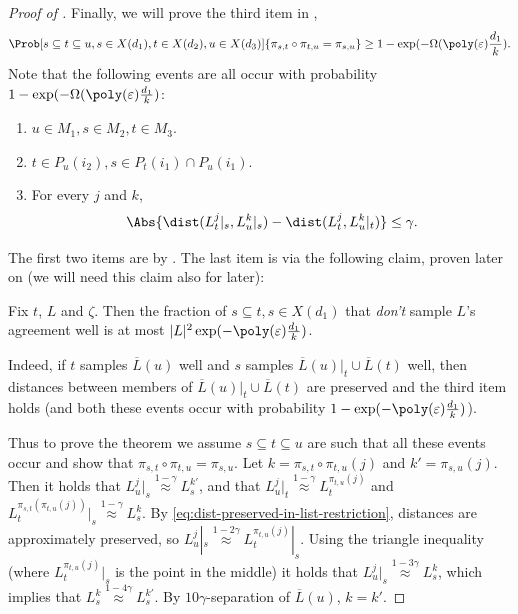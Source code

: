 \begin{proof}[Proof of ]
Finally, we will prove the third item in ,
\begin{equation*}
    \Prob[s \subseteq t \subseteq u, s \in X(d_1),t \in X(d_2), u \in X(d_3)]{\pi_{s,t}\circ \pi_{t,u} = \pi_{s,u}} \geq 1-\exp(-\Omega(\poly(\varepsilon) \frac{d_1}{k}).
\end{equation*}
Note that the following events are all occur with probability \(1-\exp(-\Omega(\poly(\varepsilon) \frac{d_1}{k})\):
\begin{enumerate}
    \item \(u \in M_1, s \in M_2, t \in M_3\).
    \item \(t \in P_u(i_2), s \in P_t(i_1) \cap P_u(i_1)\).
    \item For every \(j\) and \(k\), 
    \begin{equation} \label{eq:dist-preserved-in-list-restriction}
        \Abs{\dist(L_t^j|_s,L_u^k|_s) - \dist(L_t^j,L_u^k|_t)} \leq \gamma.
    \end{equation}
\end{enumerate}
The first two items are by . The last item is via the following claim, proven later on (we will need this claim also for later):
\begin{claim} \label{claim:most-sets-sample-well}
    Fix \(t\), \(L\) and \(\zeta\). Then the fraction of \(s \subseteq t, s\in X(d_1)\) that \emph{don't} sample \(L\)'s agreement well is at most \(|L|^2 \exp(-\poly(\varepsilon) \frac{d_1}{k})\).
\end{claim}
Indeed, if \(t\) samples \(\overline{L}(u)\) well and \(s\) samples \(\overline{L}(u)|_t \cup \overline{L}(t)\) well, then distances between members of \(\overline{L}(u)|_t \cup \overline{L}(t)\) are preserved and the third item holds (and both these events occur with probability  \(1-\exp(-\poly(\varepsilon) \frac{d_1}{k})\)).

Thus to prove the theorem we assume \(s \subseteq t \subseteq u\) are such that all these events occur and show that \(\pi_{s,t}\circ \pi_{t,u} = \pi_{s,u}\). Let \(k = \pi_{s,t}\circ \pi_{t,u}(j)\) and \(k'=\pi_{s,u}(j)\). Then it holds that \(L_u^j|_s \overset{1-\gamma}{\approx} L_s^{k'}\), and that \(L_u^j|_t \overset{1-\gamma}{\approx} L_t^{\pi_{t,u}(j)}\) and \(L_t^{\pi_{s,t}(\pi_{t,u}(j))}|_s \overset{1-\gamma}{\approx} L_s^{k}\). By \eqref{eq:dist-preserved-in-list-restriction}, distances are approximately preserved, so \(L_u^j|_s \overset{1-2\gamma}{\approx} L_t^{\pi_{t,u}(j)}|_s\). Using the triangle inequality (where \(L^{\pi_{t,u}(j)}_t|_s\) is the point in the middle) it holds that \(L_u^j|_s \overset{1-3\gamma}{\approx} L_s^{k}\), which implies that \(L_s^k \overset{1-4\gamma}{\approx} L_s^{k'}\). By \(10\gamma\)-separation of \(\overline{L}(u)\), \(k=k'\).
\end{proof}

